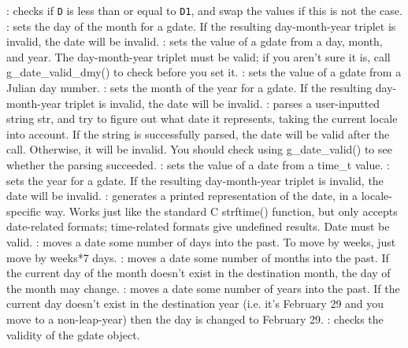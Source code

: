\begin{varlist}
    : checks if \verb+D+ is less than or equal to \verb+D1+, and swap the values if this is not the case.
    : sets the day of the month for a gdate. If the resulting day-month-year triplet is invalid, the date will be invalid.
    : sets the value of a gdate from a day, month, and year. 
    The day-month-year triplet must be valid; if you aren't sure it is, call g_date_valid_dmy() to check before you set it.
    : sets the value of a gdate from a Julian day number.
    : sets the month of the year for a gdate. If the resulting day-month-year triplet is invalid, the date will be invalid.
    : parses a user-inputted string str, and try to figure out what date it represents, taking the current locale into account. If the string is successfully parsed, the date will be valid after the call. Otherwise, it will be invalid. You should check using g_date_valid() to see whether the parsing succeeded.
    : sets the value of a date from a time_t value.
    : sets the year for a gdate. If the resulting day-month-year triplet is invalid, the date will be invalid.
    : generates a printed representation of the date, in a locale-specific way. Works just like the standard C strftime() function, but only accepts date-related formats; time-related formats give undefined results. Date must be valid.
    : moves a date some number of days into the past. To move by weeks, just move by weeks*7 days. 
    : moves a date some number of months into the past. If the current day of the month doesn't exist in the destination month, the day of the month may change. 
    : moves a date some number of years into the past. If the current day doesn't exist in the destination year (i.e. it's February 29 and you move to a non-leap-year) then the day is changed to February 29. 
    : checks the validity of the gdate object.
  \end{varlist}


